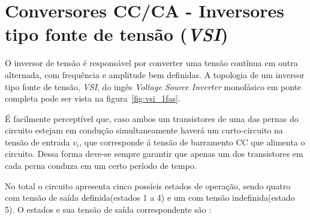 \documentclass[
	12pt,				%
	openright,			%
	onseside,
	a4paper,			%
	english,			%
	french,				%
	spanish,			%
	brazil,				%
	]{abntex2}
\begin{document}
\section{Conversores CC/CA - Inversores tipo fonte de tensão (\textit{VSI})}




O inversor de tensão é responsável por converter uma tensão contĩnua em outra alternada, com frequência e amplitude bem definidas. A topologia de um inversor tipo fonte de tensão, \emph{VSI}, do ingês \textit{Voltage Source Inverter} monofásico em ponte completa pode ser vista na figura~\ref{fig:vsi_1fas}. 

É facilmente perceptível que, caso ambos um transistores de uma das pernas do circuito estejam em condução simultaneamente haverá um curto-circuito na tensão de entrada $v_i$, que corresponde á tensão de barramento CC que alimenta o circuito. Dessa forma deve-se sempre garantir que apenas um dos transistores em cada perna conduza em um certo período de tempo.

No total o circuito apresenta cinco possíeis estados de operação, sendo quatro com tensão de saída definida(estados 1 a 4) e um com tensão indefinida(estado 5). O estados e sua tensão de saída correspondente são \cite{RASHID_VSI}:
\end{document}

